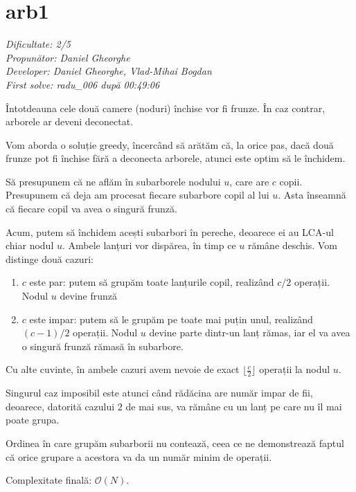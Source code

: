 \section{arb1}
\textit{Dificultate: 2/5} \\
\textit{Propunător: Daniel Gheorghe} \\
\textit{Developer: Daniel Gheorghe, Vlad-Mihai Bogdan} \\
\textit{First solve: radu\_006 după 00:49:06}  \\

\begin{remark}
    Întotdeauna cele două camere (noduri) închise vor fi frunze. În caz contrar, arborele ar deveni deconectat. 
\end{remark}

Vom aborda o soluție greedy, încercând să arătăm că, la orice pas, dacă două frunze pot fi închise fără a deconecta arborele, atunci este optim să le închidem.

Să presupunem că ne aflăm în subarborele nodului $u$, care are $c$ copii. Presupunem că deja am procesat fiecare subarbore copil al lui $u$. Asta înseamnă că fiecare copil va avea o singură frunză.

Acum, putem să închidem acești subarbori în pereche, deoarece ei au LCA-ul chiar nodul $u$. Ambele lanțuri vor dispărea, în timp ce $u$ rămâne deschis. Vom distinge două cazuri:
\begin{enumerate}
	\item $c$ este par: putem să grupăm toate lanțurile copil, realizând $c/2$ operații. Nodul $u$ devine frunză
	\item $c$ este impar: putem să le grupăm pe toate mai puțin unul, realizând $(c - 1) / 2$ operații. Nodul $u$ devine parte dintr-un lanț rămas, iar el va avea o singură frunză rămasă în subarbore.
\end{enumerate}

Cu alte cuvinte, în ambele cazuri avem nevoie de exact $\lfloor \frac{c}{2} \rfloor $ operații la nodul $u$.

Singurul caz imposibil este atunci când rădăcina are număr impar de fii, deoarece, datorită cazului $2$ de mai sus, va rămâne cu un lanț pe care nu îl mai poate grupa.

Ordinea în care grupăm subarborii nu contează, ceea ce ne demonstrează faptul că orice grupare a acestora va da un număr minim de operații.

\medskip

Complexitate finală: $\mathcal{O}(N)$.
